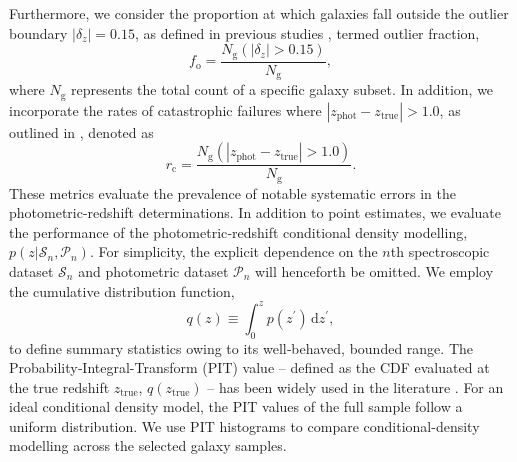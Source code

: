 Furthermore, we consider the proportion at which galaxies fall outside the outlier boundary \(\left| \delta_z \right| = 0.15\), as defined in previous studies \citep[e.g.][]{2012ApJS..198....1F, 2014ApJS..215...27Y, 2017A&A...605A..70D, 2017A&A...608A...3B, 2019A&A...622A...3D}, termed outlier fraction, 
\begin{equation} \label{eqa:6}
    f_{\mathrm{o}} = \frac{N_\mathrm{g} \left( \left| \delta_z \right| > 0.15 \right)}{N_\mathrm{g}},
\end{equation} 
where \(N_{\mathrm{g}}\) represents the total count of a specific galaxy subset. In addition, we incorporate the rates of catastrophic failures where \(\left| z_{\mathrm{phot}} - z_{\mathrm{true}} \right| > 1.0\), as outlined in \cite{2024ApJ...967L...6M}, denoted as
\begin{equation} \label{eqa:7}
    r_{\mathrm{c}} = \frac{N_\mathrm{g} \left( \left| z_{\mathrm{phot}} - z_{\mathrm{true}} \right| > 1.0 \right)}{N_\mathrm{g}}.
\end{equation}
These metrics evaluate the prevalence of notable systematic errors in the photometric-redshift determinations. In addition to point estimates, we evaluate the performance of the photometric‐redshift conditional density modelling, \(p \left(z | \mathcal{S}_n, \mathcal{P}_n \right) \). For simplicity, the explicit dependence on the \(n\)th spectroscopic dataset \(\mathcal{S}_n\) and photometric dataset \(\mathcal{P}_n\) will henceforth be omitted. We employ the cumulative distribution function,
\begin{equation} \label{eqa:8}
    q \left(z\right) \equiv \int_{0}^{z} p \left(z^\prime\right) \,\mathrm{d}z^\prime,
\end{equation}
to define summary statistics owing to its well‐behaved, bounded range. The Probability‐Integral-Transform (PIT) value -- defined as the CDF evaluated at the true redshift \(z_{\mathrm{true}}\), \(q \left( z_{\mathrm{true}} \right)\) -- has been widely used in the literature \citep[e.g.][]{2012MNRAS.421.1671B, 2017MNRAS.468.4556F, 2018PASJ...70S...9T, 2020MNRAS.499.1587S}. For an ideal conditional density model, the PIT values of the full sample follow a uniform distribution. We use PIT histograms to compare conditional-density modelling across the selected galaxy samples.

